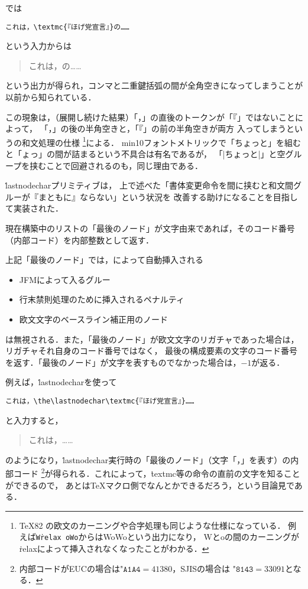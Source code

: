 \documentclass[a4paper,11pt,nomag]{jsarticle}
\begin{document}
\pTeX では
\begin{verbatim}
これは，\textmc{『ほげ党宣言』}の……
\end{verbatim}
という入力からは
\begin{quote}
これは，の……
\end{quote}
という出力が得られ，コンマと二重鍵括弧の間が全角空きになってしまうことが以前から知られている．

この現象は，（展開し続けた結果）「，」の直後のトークンが「『」ではないことによって，
「，」の後の半角空きと，「『」の前の半角空きが両方
入ってしまうという\pTeX の和文処理の仕様
\footnote{%
  \TeX82 の欧文のカーニングや合字処理も同じような仕様になっている．
  例えば\texttt{W\.{relax}\ oWo}からはW\relax oWoという出力になり，
  Wとoの間のカーニングが\.{relax}によって挿入されなくなったことがわかる．
}による．
min10フォントメトリックで「ちょっと」を組むと「ょっ」の間が詰まるという不具合は有名であるが，
「|ちょ{}っと|」と空グループを挟むことで回避されるのも，同じ理由である．

\medskip

\.{lastnodechar}プリミティブは，
上で述べた「書体変更命令を間に挟むと和文間グルーが『まともに』ならない」という状況を
改善する助けになることを目指して実装された．

\begin{cslist}
  \csitem[\.{lastnodechar}]
  現在構築中のリストの「最後のノード」が文字由来であれば，そのコード番号（内部コード）を内部整数として返す．
  
  上記「最後のノード」では，\pTeX によって自動挿入される
  \begin{itemize}
    \item JFMによって入るグルー
    \item 行末禁則処理のために挿入されるペナルティ
    \item 欧文文字のベースライン補正用のノード
  \end{itemize}
  は無視される．また，「最後のノード」が欧文文字のリガチャであった場合は，リガチャそれ自身のコード番号ではなく，
  最後の構成要素の文字のコード番号を返す．「最後のノード」が文字を表すものでなかった場合は，$-1$が返る．
\end{cslist}

例えば，\.{lastnodechar}を使って
\begin{verbatim}
これは，\the\lastnodechar\textmc{『ほげ党宣言』}……
\end{verbatim}
と入力すると，
\begin{quote}
これは，\the\lastnodechar{}……
\end{quote}
のようになり，\.{lastnodechar}実行時の「最後のノード」（文字「，」を表す）の内部コード
\footnote{%
  内部コードがEUCの場合は$\texttt{"A1A4} = 41380$，SJISの場合は
  $\texttt{"8143} = 33091$となる．
}が得られる．これによって，\.{textmc}等の命令の直前の文字を知ることができるので，
あとは\TeX マクロ側でなんとかできるだろう，という目論見である．
\end{document}
